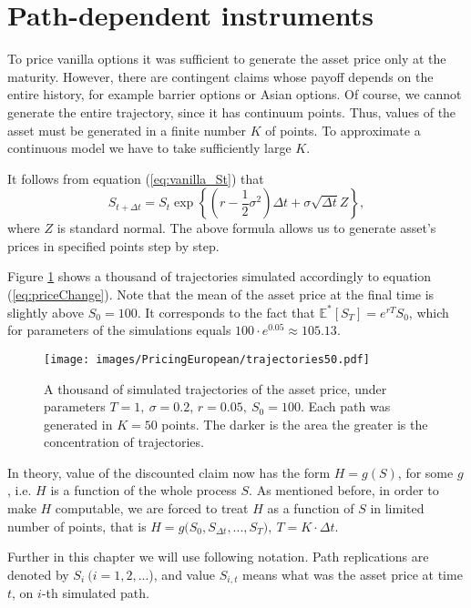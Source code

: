 \documentclass[a4paper,11pt, twoside]{book}
\theoremstyle{definition}
\theoremstyle{remark}
\newcounter{example}[chapter]
\def\Em{{\mathbb{E}^*}}
\begin{document}
\section{Path-dependent instruments}
\label{sec:pricing_complicated}

To price vanilla options it was sufficient to generate the asset price only at the maturity. However, there are contingent claims whose payoff depends on the entire history, for example barrier options or Asian options. Of course, we cannot generate the entire trajectory, since it has continuum points. Thus, values of the asset must be generated in a finite number $K$ of points. To approximate a continuous model we have to take sufficiently large $K$.

It follows from equation (\ref{eq:vanilla_St}) that
\begin{equation}
 \label{eq:priceChange}
 S_{t + {\Delta} t} = S_t \exp\left\{ (r - \frac{1}{2}\sigma^2)\Delta t + \sigma \sqrt{\Delta t} Z \right\},
\end{equation}
where $Z$ is standard normal. The above formula allows us to generate asset's prices in specified points step by step.

Figure \ref{fig:trajectories} shows a thousand of trajectories simulated accordingly to equation (\ref{eq:priceChange}). Note that the mean of the asset price at the final time is slightly above $S_0 = 100$. It corresponds to the fact that $\Em [S_T] = e^{rT}S_0$, which for parameters of the simulations equals $100\cdot e^{0.05} \approx 105.13$.

\begin{figure}[ht]
\centering
 \texttt{[image: images/PricingEuropean/trajectories50.pdf]}
\caption{A thousand of simulated trajectories of the asset price, under parameters ${T=1},\ {\sigma=0.2}$, ${r=0.05},\ {S_0=100}$. Each path was generated in $K=50$ points. The darker is the area the greater is the concentration of trajectories.}
\label{fig:trajectories}
\end{figure}

In theory, value of the discounted claim now has the form $H = g(S)$, for some $g$, i.e. $H$ is a function of the whole process $S$. As mentioned before, in order to make $H$ computable, we are forced to treat $H$ as a function of $S$ in limited number of points, that is $H = g\bigl(S_0, S_{\Delta t}, ..., S_T\bigr),\ T = K\cdot\Delta t$.

Further in this chapter we will use following notation. Path replications are denoted by $S_i\ (i=1,2,...$), and value $S_{i,t}$ means what was the asset price at time $t$, on $i$-th simulated path.
\end{document}
